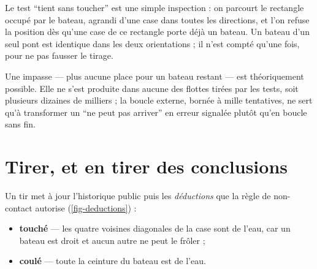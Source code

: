 Le test \enquote{tient sans toucher} est une simple inspection : on parcourt le rectangle
occupé par le bateau, agrandi d'une case dans toutes les directions, et l'on refuse la
position dès qu'une case de ce rectangle porte déjà un bateau. Un bateau d'un seul pont est
identique dans les deux orientations ; il n'est compté qu'une fois, pour ne pas fausser le
tirage.

Une impasse --- plus aucune place pour un bateau restant --- est théoriquement possible.
Elle ne s'est produite dans aucune des flottes tirées par les tests, soit plusieurs
dizaines de milliers ; la boucle externe, bornée à mille tentatives, ne sert qu'à transformer un
\enquote{ne peut pas arriver} en erreur signalée plutôt qu'en boucle sans fin.

\section{Tirer, et en tirer des conclusions}
\label{sec-deductions}

Un tir met à jour l'historique public puis les \emph{déductions} que la règle de
non-contact autorise (\cref{fig-deductions}) :

\begin{itemize}
    \item \textbf{touché} --- les quatre voisines diagonales de la case sont de l'eau, car
          un bateau est droit et aucun autre ne peut le frôler ;
    \item \textbf{coulé} --- toute la ceinture du bateau est de l'eau.
\end{itemize}

